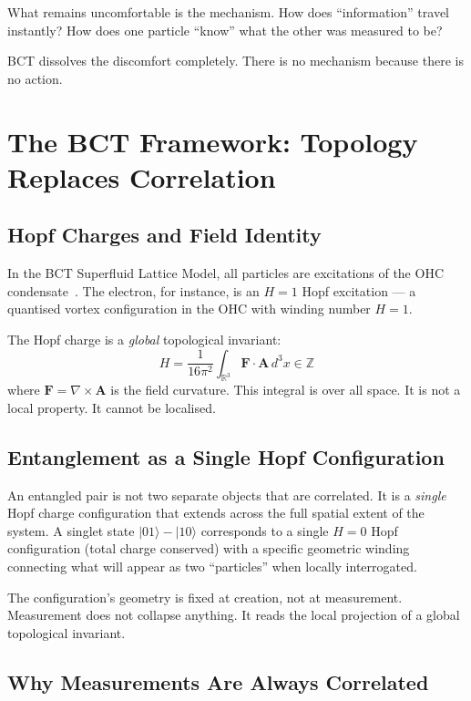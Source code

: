 \documentclass[aps,prl,twocolumn,showpacs,preprintnumbers]{revtex4-2}
\begin{document}
What remains uncomfortable is the mechanism. How does
``information'' travel instantly? How does one particle
``know'' what the other was measured to be?

BCT dissolves the discomfort completely. There is no
mechanism because there is no action.

\section{The BCT Framework: Topology Replaces Correlation}

\subsection{Hopf Charges and Field Identity}

In the BCT Superfluid Lattice Model, all particles are
excitations of the OHC condensate~\cite{l36}. The electron,
for instance, is an $H = 1$ Hopf excitation --- a quantised
vortex configuration in the OHC with winding number $H = 1$.

The Hopf charge is a \emph{global} topological invariant:
\begin{equation}
H = \frac{1}{16\pi^2} \int_{\mathbb{R}^3}
\mathbf{F} \cdot \mathbf{A} \, d^3x \in \mathbb{Z}
\end{equation}
where $\mathbf{F} = \nabla \times \mathbf{A}$ is the field
curvature. This integral is over all space. It is not a local
property. It cannot be localised.

\subsection{Entanglement as a Single Hopf Configuration}

An entangled pair is not two separate objects that are
correlated. It is a \emph{single} Hopf charge configuration
that extends across the full spatial extent of the system.
A singlet state $|01\rangle - |10\rangle$ corresponds to a
single $H = 0$ Hopf configuration (total charge conserved)
with a specific geometric winding connecting what will appear
as two ``particles'' when locally interrogated.

The configuration's geometry is fixed at creation, not at
measurement. Measurement does not collapse anything. It reads
the local projection of a global topological invariant.

\subsection{Why Measurements Are Always Correlated}
\end{document}
